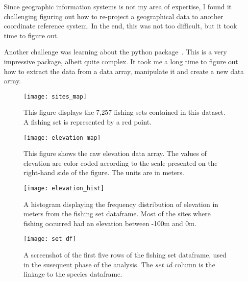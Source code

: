 Since geographic information systems is not my area of expertise, I found it challenging figuring out how to re-project a geographical data to another
coordinate reference system.
In the end, this was not too difficult, but it took time to figure out.

Another challenge was learning about the  python package~\cite{xarray}.
This is a very impressive package, albeit quite complex.
It took me a long time to figure out how to extract the data from a data array, manipulate it and create a new data array.


\begin{figure}
    \texttt{[image: sites\_map]}
    \caption{
        This figure displays the 7,257 fishing sets contained in this dataset.
        A fishing set is represented by a red point.
    }
    \label{fig:set_map}
\end{figure}

\begin{figure}
    \texttt{[image: elevation\_map]}
    \caption{
        This figure shows the raw elevation data array.
        The values of elevation are color coded according to the scale presented on the right-hand side of the figure.
        The units are in meters.
    }
    \label{fig:elevation_map}
\end{figure}

\begin{figure}
    \texttt{[image: elevation\_hist]}
    \caption{
        A histogram displaying the frequency distribution of elevation in meters from the fishing set dataframe.
        Most of the sites where fishing occurred had an elevation between -100m and 0m.
    }
    \label{fig:elevation_hist}
\end{figure}

\begin{figure}
    \texttt{[image: set\_df]}
    \caption{
        A screenshot of the first five rows of the fishing set dataframe, used in the susequent phase of the analysis.
        The $set\_id$ column is the linkage to the species dataframe.
    }
    \label{fig:set_df}
\end{figure}